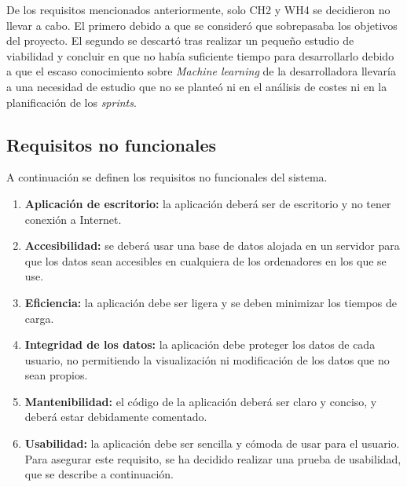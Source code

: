De los requisitos mencionados anteriormente, solo CH2 y WH4 se decidieron no llevar a cabo. El primero debido a que se consideró que sobrepasaba los objetivos del proyecto. El segundo se descartó tras realizar un pequeño estudio de viabilidad y concluir en que no había suficiente tiempo para desarrollarlo debido a que el escaso conocimiento sobre \textit{Machine learning} de la desarrolladora llevaría a una necesidad de estudio que no se planteó ni en el análisis de costes ni en la planificación de los \textit{sprints}.


\subsection{Requisitos no funcionales}
A continuación se definen los requisitos no funcionales del sistema.
\begin{enumerate}
	\item \textbf{Aplicación de escritorio:} la aplicación deberá ser de escritorio y no tener conexión a Internet.
	\item \textbf{Accesibilidad:} se deberá usar una base de datos alojada en un servidor para que los datos sean accesibles en cualquiera de los ordenadores en los que se use.
	\item \textbf{Eficiencia:} la aplicación debe ser ligera y se deben minimizar los tiempos de carga.
	\item \textbf{Integridad de los datos:} la aplicación debe proteger los datos de cada usuario, no permitiendo la visualización ni modificación de los datos que no sean propios.
	\item \textbf{Mantenibilidad:} el código de la aplicación deberá ser claro y conciso, y deberá estar debidamente comentado.
	\item \textbf{Usabilidad:} la aplicación debe ser sencilla y cómoda de usar para el usuario. Para asegurar este requisito, se ha decidido realizar una prueba de usabilidad, que se describe a continuación.
\end{enumerate}


